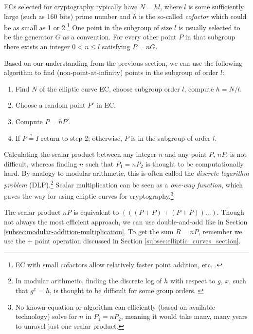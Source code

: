 ECs selected for cryptography typically have $N = hl$, where $l$ is some sufficiently large (such as 160 bits) prime number and $h$ is the so-called {\em cofactor} which could be as small as 1 or 2.\footnote{EC with small cofactors allow relatively faster point addition, etc. \cite{Bernstein2008-twisted-edwards}.} One point in the subgroup of size $l$ is usually selected to be the generator $G$ as a convention. For every other point $P$ in that subgroup there exists an integer $0 < n \leq l$ satisfying $P = n G$.

Based on our understanding from the previous section, we can use the following algorithm to find (non-point-at-infinity) points in the subgroup of order $l$:
\begin{enumerate}
    \item Find $N$ of the elliptic curve EC, choose subgroup order $l$, compute $h = N/l$.
    \item Choose a random point $P'$ in EC.
    \item Compute $P=h P'$.
    \item If $P \stackrel{?}{=} I$ return to step 2; otherwise, $P$ is in the subgroup of order $l$.
\end{enumerate}

Calculating the scalar product between any integer $n$ and any point $P$, $nP$, is not difficult, whereas finding $n$ such that $P_1 = n P_2$ is thought to be computationally hard. By analogy to modular arithmetic, this is often called the {\em discrete logarithm problem} (DLP).\footnote{In modular arithmetic, finding the discrete log of $h$ with respect to $g$, $x$, such that $g^x = h$, is thought to be difficult for some group orders. \cite{network-security-crash-course-dlp}} Scalar multiplication can be seen as a {\em one-way function}, which paves the way for using elliptic curves for cryptography.\footnote{No known equation or algorithm can efficiently (based on available technology) solve for $n$ in $P_1 = n P_2$, meaning it would take many, many years to unravel just one scalar product.}

The scalar product $nP$ is equivalent to $(((P+P)+(P+P))...)$. Though not always the most efficient approach, we can use double-and-add like in Section \ref{subsec:modular-addition-multiplication}. To get the sum $R = n P$, remember we use the $+$ point operation discussed in Section \ref{subsec:elliptic_curves_section}.

